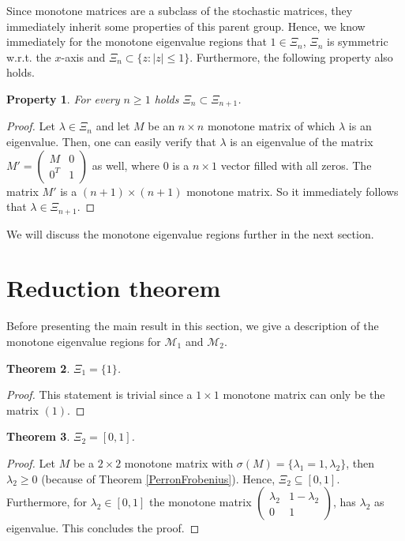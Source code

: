\documentclass[11pt,a4paper]{article}
\newtheorem{theorem}{Theorem}[section]
\newtheorem{property}[theorem]{Property}
\theoremstyle{definition}
\theoremstyle{remark}
\begin{document}
Since monotone matrices are a subclass of the stochastic matrices, they immediately inherit some properties of this parent group. Hence, we know immediately for the monotone eigenvalue regions that \(1 \in \Xi_n\), \(\Xi_n\) is symmetric w.r.t. the \(x\)-axis and \(\Xi_n \subset \{z : |z| \leqslant 1\}\). Furthermore, the following property also holds.

\begin{property}
    For every \(n \geq 1\) holds \(\Xi_n \subset \Xi_{n+1}\).
\end{property}
\begin{proof}
    Let \(\lambda \in \Xi_n\) and let \(M\) be an \(n \times n\) monotone matrix of which \(\lambda\) is an eigenvalue. Then, one can easily verify that \(\lambda\) is an eigenvalue of the matrix
    \(M' = \begin{pmatrix}
        M & 0 \\
        0^{T} & 1
    \end{pmatrix}\)
    as well, where \(0\) is a \( n \times 1\) vector filled with all zeros. The matrix \(M'\) is a \((n+1) \times (n+1) \) monotone matrix. So it immediately follows that \(\lambda \in \Xi_{n+1} \).
\end{proof}

We will discuss the monotone eigenvalue regions further in the next section.
\section{Reduction theorem}\label{Reduction theorem}

Before presenting the main result in this section, we give a description of the monotone eigenvalue regions for \(\mathcal{M}_1\) and \(\mathcal{M}_2\).

\begin{theorem}
    \( \Xi_1 = \{ 1 \} \).
\end{theorem}
\begin{proof}
    This statement is trivial since a \(1 \times 1\) monotone matrix can only be the matrix \((1)\).
\end{proof}

\begin{theorem}
    \( \Xi_2 = [0,1] \).
\end{theorem}
\begin{proof}
    Let \(M\) be a \(2 \times 2\) monotone matrix with \(\sigma(M)= \{\lambda_1 = 1, \lambda_2 \}\), then \(\lambda_2 \geqslant 0\) (because of Theorem \ref{PerronFrobenius}). Hence, \(\Xi_2 \subseteq [0,1]\). Furthermore, for \(\lambda_2 \in [0,1] \) the monotone matrix \(\begin{pmatrix}
                \lambda_2 & 1 - \lambda_2 \\
                0 & 1 
            \end{pmatrix}\), has \(\lambda_2\) as eigenvalue. This concludes the proof.
\end{proof}
\end{document}
